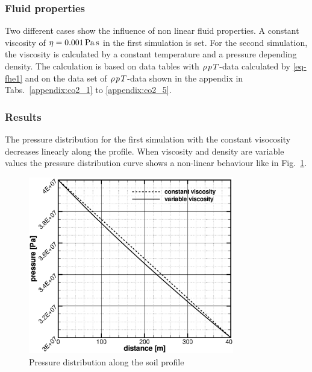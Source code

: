 \subsubsection*{Fluid properties}

Two different cases show the influence of non linear fluid properties. A constant viscosity of $\mathrm{\eta}=\unit[0.001]{Pa\,s}$ in the first simulation is set. For the second simulation, the  viscosity is calculated by a constant temperature and a pressure depending density. The calculation is based on data tables with $\rho\hspace{0.04cm}p\hspace{0.04cm}T$-data calculated by \eqref{eq-fhe1} and on the data set of 
$\rho\hspace{0.04cm}p\hspace{0.04cm}T$-data shown in the appendix in Tabs.~\ref{appendix:co2_1} to \ref{appendix:co2_5}.

\subsubsection*{Results}

The pressure distribution for the first simulation with the constant visocosity decreases linearly along the profile. When viscosity and density are variable values the pressure distribution curve shows a non-linear behaviour like in Fig.~\ref{fig-eos-result}.

\begin{figure}[h]
\centering
\includegraphics[width=0.8\textwidth]{FLUID_PROPERTIES/figures/result-co2-flow.eps}
\caption{\label{fig-eos-result}Pressure distribution along the soil profile}
\end{figure}
